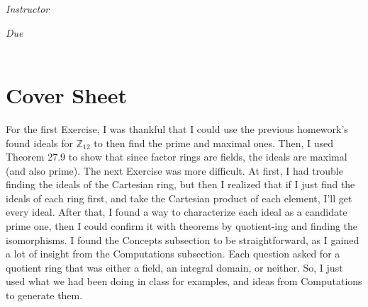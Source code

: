 \documentclass[12pt, oneside]{book}
\newcommand{\Z}{\mathbb{Z}}
\begin{document}
\begin{titlepage}
\begin{center}
\begin{large}
            \vspace*{1\baselineskip}

            \textit{Instructor} \\[1ex] %
            \professor

            \vspace*{1\baselineskip}

            \textit{Due}\\[1ex]
            {\scshape  \finaldate} \\[0.3\baselineskip] %

            \thispagestyle{empty}

        \end{large}
    \end{center}
\end{titlepage}


\section*{Cover Sheet}

For the first Exercise, I was thankful that I could use the previous homework's found ideals for \(\Z_{12}\) to then find the prime and maximal ones. Then, I used Theorem 27.9 to show that since factor rings are fields, the ideals are maximal (and also prime). The next Exercise was more difficult. At first, I had trouble finding the ideals of the Cartesian ring, but then I realized that if I just find the ideals of each ring first, and take the Cartesian product of each element, I'll get every ideal. After that, I found a way to characterize each ideal as a candidate prime one, then I could confirm it with theorems by quotient-ing and finding the isomorphisms. I found the Concepts subsection to be straightforward, as I gained a lot of insight from the Computations subsection. Each question asked for a quotient ring that was either a field, an integral domain, or neither. So, I just used what we had been doing in class for examples, and ideas from Computations to generate them. \\
\end{document}
